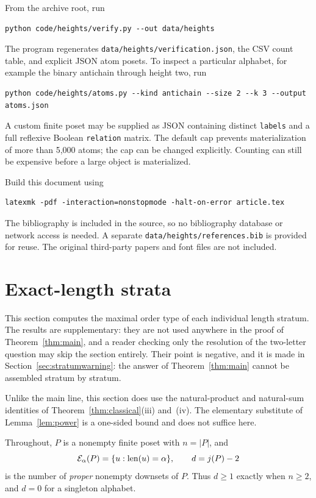 \documentclass[11pt,a4paper]{article}
\numberwithin{equation}{section}
\theoremstyle{definition}
\theoremstyle{remark}
\newcommand{\len}{\mathop{\rm len}}
\newcommand{\E}{\mathcal E}
\begin{document}
From the archive root, run
\begin{lstlisting}
python code/heights/verify.py --out data/heights
\end{lstlisting}
The program regenerates \texttt{data/heights/verification.json}, the CSV count
table, and explicit JSON atom posets. To inspect a particular alphabet,
for example the binary antichain through height two, run
\begin{lstlisting}
python code/heights/atoms.py --kind antichain --size 2 --k 3 --output atoms.json
\end{lstlisting}
A custom finite poset may be supplied as JSON containing distinct
\texttt{labels} and a full reflexive Boolean \texttt{relation} matrix.
The default cap prevents materialization of more than 5,000 atoms; the
cap can be changed explicitly. Counting can still be expensive before
a large object is materialized.

Build this document using
\begin{lstlisting}
latexmk -pdf -interaction=nonstopmode -halt-on-error article.tex
\end{lstlisting}
The bibliography is included in the source, so no bibliography database
or network access is needed. A separate \texttt{data/heights/references.bib} is
provided for reuse. The original third-party papers and font files are
not included.


\section{Exact-length strata}
\label{sec:exact}

This section computes the maximal order type of each individual length
stratum. The results are supplementary: they are not used anywhere in the
proof of Theorem~\ref{thm:main}, and a reader checking only the resolution of
the two-letter question may skip the section entirely. Their point is
negative, and it is made in Section~\ref{sec:stratumwarning}: the answer of
Theorem~\ref{thm:main} cannot be assembled stratum by stratum.

Unlike the main line, this section does use the natural-product and
natural-sum identities of Theorem~\ref{thm:classical}(iii) and~(iv). The
elementary substitute of Lemma~\ref{lem:power} is a one-sided bound and does
not suffice here.

Throughout, $P$ is a nonempty finite poset with $n=|P|$, and
\[
 \E_\alpha(P)=\{u:\len(u)=\alpha\},
 \qquad
 d=j(P)-2
\]
is the number of \emph{proper} nonempty downsets of $P$. Thus $d\ge1$ exactly
when $n\ge2$, and $d=0$ for a singleton alphabet.
\end{document}
